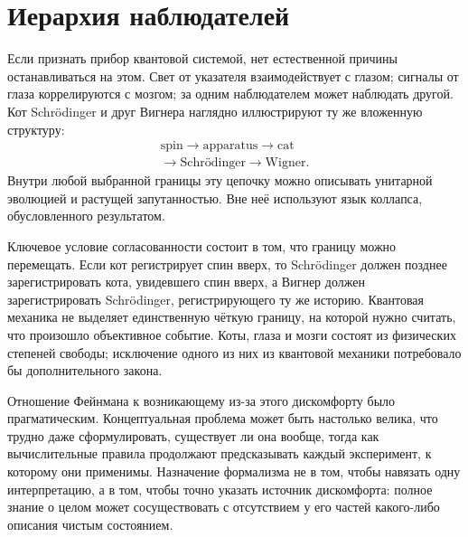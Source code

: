 \section{Иерархия наблюдателей}

Если признать прибор квантовой системой, нет естественной причины останавливаться на этом. Свет от указателя взаимодействует с глазом; сигналы от глаза коррелируются с мозгом; за одним наблюдателем может наблюдать другой. Кот Schr\"odinger и друг Вигнера наглядно иллюстрируют ту же вложенную структуру:
\begin{equation}
\begin{gathered}
\text{spin}
\longrightarrow
\text{apparatus}
\longrightarrow
\text{cat}\\
\longrightarrow
\text{Schr\"odinger}
\longrightarrow
\text{Wigner}.
\end{gathered}
\label{eq:l7-observer-chain}
\end{equation}
Внутри любой выбранной границы эту цепочку можно описывать унитарной эволюцией и растущей запутанностью. Вне неё используют язык коллапса, обусловленного результатом.

Ключевое условие согласованности состоит в том, что границу можно перемещать. Если кот регистрирует спин вверх, то Schr\"odinger должен позднее зарегистрировать кота, увидевшего спин вверх, а Вигнер должен зарегистрировать Schr\"odinger, регистрирующего ту же историю. Квантовая механика не выделяет единственную чёткую границу, на которой нужно считать, что произошло объективное событие. Коты, глаза и мозги состоят из физических степеней свободы; исключение одного из них из квантовой механики потребовало бы дополнительного закона.

Отношение Фейнмана к возникающему из-за этого дискомфорту было прагматическим. Концептуальная проблема может быть настолько велика, что трудно даже сформулировать, существует ли она вообще, тогда как вычислительные правила продолжают предсказывать каждый эксперимент, к которому они применимы. Назначение формализма не в том, чтобы навязать одну интерпретацию, а в том, чтобы точно указать источник дискомфорта: полное знание о целом может сосуществовать с отсутствием у его частей какого-либо описания чистым состоянием.

\begin{classroomqa}
\end{classroomqa}


